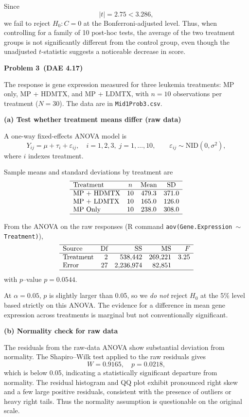 \documentclass[answers,12pt,addpoints]{exam}
\begin{document}
Since
\[
|t| = 2.75 < 3.286,
\]
we fail to reject $H_0 : C = 0$ at the Bonferroni-adjusted level. Thus, when
controlling for a family of 10 post-hoc tests, the average of the two
treatment groups is not significantly different from the control group, even
though the unadjusted $t$-statistic suggests a noticeable decrease in score.

\textbf{Problem 3 \,(DAE 4.17)}

The response is gene expression measured for three leukemia treatments:
MP only, MP + HDMTX, and MP + LDMTX, with $n=10$ observations per
treatment ($N=30$). The data are in \texttt{Mid1Prob3.csv}.

\medskip
\textbf{(a) Test whether treatment means differ (raw data)}

A one-way fixed-effects ANOVA model is
\[
Y_{ij} = \mu + \tau_i + \varepsilon_{ij},\quad
i=1,2,3,\; j=1,\dots,10,\qquad
\varepsilon_{ij} \sim \mathrm{NID}(0,\sigma^2),
\]
where $i$ indexes treatment.

Sample means and standard deviations by treatment are
\[
\begin{array}{lccc}
\hline
\text{Treatment} & n & \text{Mean} & \text{SD} \\
\hline
\text{MP + HDMTX} & 10 & 479.3 & 371.0 \\
\text{MP + LDMTX} & 10 & 165.0 & 126.0 \\
\text{MP Only}    & 10 & 238.0 & 308.0 \\
\hline
\end{array}
\]

From the ANOVA on the raw responses (R command
\texttt{aov(Gene.Expression $\sim$ Treatment)}),
\[
\begin{array}{lrrrr}
\hline
\text{Source} & \text{Df} & \text{SS} & \text{MS} & F \\
\hline
\text{Treatment} &  2 & 538{,}442 & 269{,}221 & 3.25 \\
\text{Error}     & 27 & 2{,}236{,}974 & 82{,}851 &     \\
\hline
\end{array}
\]
with $p$–value $p = 0.0544$.

At $\alpha = 0.05$, $p$ is slightly larger than 0.05, so we \emph{do not}
reject $H_0$ at the 5\% level based strictly on this ANOVA. The evidence
for a difference in mean gene expression across treatments is marginal
but not conventionally significant.

\medskip
\textbf{(b) Normality check for raw data}

The residuals from the raw-data ANOVA show substantial deviation from
normality. The Shapiro–Wilk test applied to the raw residuals gives
\[
W = 0.9165,\quad p = 0.0218,
\]
which is below 0.05, indicating a statistically significant departure
from normality. The residual histogram and QQ plot 
exhibit pronounced right skew and a few large positive residuals,
consistent with the presence of outliers or heavy right tails. Thus the
normality assumption is questionable on the original scale.
\end{document}

